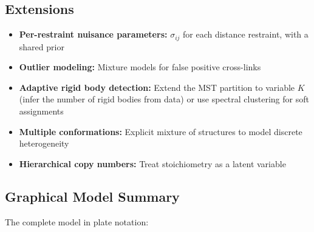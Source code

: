 \documentclass[11pt,a4paper]{article}
\theoremstyle{definition}
\begin{document}
\subsection{Extensions}

\begin{itemize}
    \item \textbf{Per-restraint nuisance parameters:} $\sigma_{ij}$ for each distance restraint, with a shared prior
    \item \textbf{Outlier modeling:} Mixture models for false positive cross-links
    \item \textbf{Adaptive rigid body detection:} Extend the MST partition to variable $K$ (infer the number of rigid bodies from data) or use spectral clustering for soft assignments
    \item \textbf{Multiple conformations:} Explicit mixture of structures to model discrete heterogeneity
    \item \textbf{Hierarchical copy numbers:} Treat stoichiometry as a latent variable
\end{itemize}

\subsection{Graphical Model Summary}

The complete model in plate notation:
\end{document}
